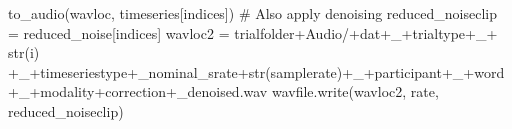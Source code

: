\documentclass[
  letterpaper,
  DIV=11,
  numbers=noendperiod]{scrreprt}
\newenvironment{Shaded}{\begin{snugshade}}{\end{snugshade}}
\newcommand{\BuiltInTok}[1]{\textcolor[rgb]{0.00,0.23,0.31}{#1}}
\newcommand{\CommentTok}[1]{\textcolor[rgb]{0.37,0.37,0.37}{#1}}
\newcommand{\NormalTok}[1]{\textcolor[rgb]{0.00,0.23,0.31}{#1}}
\newcommand{\OperatorTok}[1]{\textcolor[rgb]{0.37,0.37,0.37}{#1}}
\newcommand{\StringTok}[1]{\textcolor[rgb]{0.13,0.47,0.30}{#1}}
\begin{document}
\begin{Shaded}
\begin{Highlighting}[]
\NormalTok{                            to\_audio(wavloc, timeseries[indices])}
                          \CommentTok{\# Also apply denoising}
\NormalTok{                            reduced\_noiseclip }\OperatorTok{=}\NormalTok{ reduced\_noise[indices]}
\NormalTok{                            wavloc2 }\OperatorTok{=}\NormalTok{ trialfolder}\OperatorTok{+}\StringTok{\textquotesingle{}Audio/\textquotesingle{}}\OperatorTok{+}\NormalTok{dat}\OperatorTok{+}\StringTok{\textquotesingle{}\_\textquotesingle{}}\OperatorTok{+}\NormalTok{trialtype}\OperatorTok{+}\StringTok{\textquotesingle{}\_\textquotesingle{}}\OperatorTok{+} \BuiltInTok{str}\NormalTok{(i) }\OperatorTok{+}\StringTok{\textquotesingle{}\_\textquotesingle{}}\OperatorTok{+}\NormalTok{timeseriestype}\OperatorTok{+}\StringTok{\textquotesingle{}\_nominal\_srate\textquotesingle{}}\OperatorTok{+}\BuiltInTok{str}\NormalTok{(samplerate)}\OperatorTok{+}\StringTok{\textquotesingle{}\_\textquotesingle{}}\OperatorTok{+}\NormalTok{participant}\OperatorTok{+}\StringTok{\textquotesingle{}\_\textquotesingle{}}\OperatorTok{+}\NormalTok{word}\OperatorTok{+}\StringTok{\textquotesingle{}\_\textquotesingle{}}\OperatorTok{+}\NormalTok{modality}\OperatorTok{+}\NormalTok{correction}\OperatorTok{+}\StringTok{\textquotesingle{}\_denoised.wav\textquotesingle{}}
\NormalTok{                            wavfile.write(wavloc2, rate, reduced\_noiseclip)}
            

\end{Highlighting}
\end{Shaded}
\end{document}
